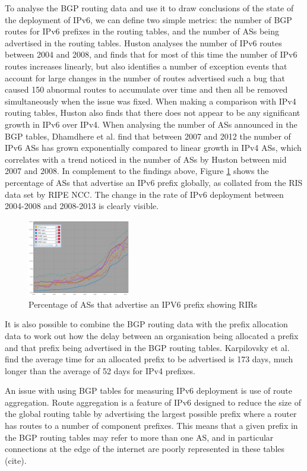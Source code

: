 To analyse the BGP routing data and use it to draw conclusions of the state of
the deployment of IPv6, we can define two simple metrics: the number of BGP
routes for IPv6 prefixes in the routing tables, and the number of ASs being
advertised in the routing tables. Huston analyses the number of IPv6 routes
between 2004 and 2008, and finds that for most of this time the number of IPv6
routes increases linearly, but also identifies a number of exception events that
account for large changes in the number of routes advertised such a bug that
caused 150 abnormal routes to accumulate over time and then all be removed
simultaneously when the issue was fixed. When making a comparison with IPv4
routing tables, Huston also finds that there does not appear to be any
significant growth in IPv6 over IPv4. When analysing the number of ASs announced
in the BGP tables, Dhamdhere et al. find that between 2007 and 2012 the number
of IPv6 ASs has grown exponentially compared to linear growth in IPv4 ASs, which
correlates with a trend noticed in the number of ASs by Huston between mid 2007
and 2008. In complement to the findings above, Figure \ref{fig:bgp-rirs} shows the percentage
of ASs that advertise an IPv6 prefix globally, as collated from the RIS data set
by RIPE NCC. The change in the rate of IPv6 deployment between 2004-2008 and
2008-2013 is clearly visible.

\begin{figure}[htb]
\centering
\includegraphics[width=0.4\textwidth]{img/v6-bgp-rirs.png}
\caption{Percentage of ASs that advertise an IPV6 prefix showing RIRs}
\label{fig:bgp-rirs}
\end{figure}

It is also possible to combine the BGP routing data with the prefix allocation
data to work out how the delay between an organisation being allocated a prefix
and that prefix being advertised in the BGP routing tables. Karpilovsky et al.
find the average time for an allocated prefix to be advertised is 173 days, much
longer than the average of 52 days for IPv4 prefixes.

An issue with using BGP tables for measuring IPv6 deployment is use of route
aggregation. Route aggregation is a feature of IPv6 designed to reduce the size of the
global routing table by advertising the largest possible prefix where a router
has routes to a number of component prefixes. This means that a given prefix in
the BGP routing tables may refer to more than one AS, and in particular
connections at the edge of the internet are poorly represented in these
tables (cite).


